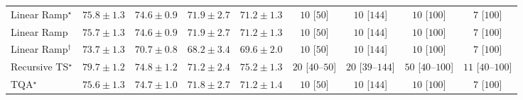 \begin{tabular}{l|cccc|cccc|}
Linear Ramp$^\star$ & {\cellcolor[HTML]{8948A0}} \color[HTML]{F1F1F1} $75.8\pm 1.3$ & {\cellcolor[HTML]{8A59A8}} \color[HTML]{F1F1F1} $74.6\pm 0.9$ & {\cellcolor[HTML]{8C81BC}} \color[HTML]{F1F1F1} $71.9\pm 2.7$ & {\cellcolor[HTML]{8C8CC1}} \color[HTML]{F1F1F1} $71.2\pm 1.3$ & {\cellcolor[HTML]{FFF7F3}} \color[HTML]{000000} $10$ [$50$] & {\cellcolor[HTML]{FFF7F3}} \color[HTML]{000000} $10$ [$144$] & {\cellcolor[HTML]{FFF7F3}} \color[HTML]{000000} $10$ [$100$] & {\cellcolor[HTML]{FFF7F3}} \color[HTML]{000000} $7$ [$100$] \\
Linear Ramp & {\cellcolor[HTML]{8949A1}} \color[HTML]{F1F1F1} $75.7\pm 1.3$ & {\cellcolor[HTML]{8A59A8}} \color[HTML]{F1F1F1} $74.6\pm 0.9$ & {\cellcolor[HTML]{8C81BC}} \color[HTML]{F1F1F1} $71.9\pm 2.7$ & {\cellcolor[HTML]{8C8CC1}} \color[HTML]{F1F1F1} $71.2\pm 1.3$ & {\cellcolor[HTML]{FFF7F3}} \color[HTML]{000000} $10$ [$50$] & {\cellcolor[HTML]{FFF7F3}} \color[HTML]{000000} $10$ [$144$] & {\cellcolor[HTML]{FFF7F3}} \color[HTML]{000000} $10$ [$100$] & {\cellcolor[HTML]{FFF7F3}} \color[HTML]{000000} $7$ [$100$] \\
Linear Ramp$^\dagger$ & {\cellcolor[HTML]{8C66AF}} \color[HTML]{F1F1F1} $73.7\pm 1.3$ & {\cellcolor[HTML]{8C93C4}} \color[HTML]{F1F1F1} $70.7\pm 0.8$ & {\cellcolor[HTML]{9AB4D6}} \color[HTML]{000000} $68.2\pm 3.4$ & {\cellcolor[HTML]{92A3CD}} \color[HTML]{F1F1F1} $69.6\pm 2.0$ & {\cellcolor[HTML]{FFF7F3}} \color[HTML]{000000} $10$ [$50$] & {\cellcolor[HTML]{FFF7F3}} \color[HTML]{000000} $10$ [$144$] & {\cellcolor[HTML]{FFF7F3}} \color[HTML]{000000} $10$ [$100$] & {\cellcolor[HTML]{FFF7F3}} \color[HTML]{000000} $7$ [$100$] \\
Recursive TS$^\star$ & {\cellcolor[HTML]{760C71}} \color[HTML]{F1F1F1} $79.7\pm 1.2$ & {\cellcolor[HTML]{8A56A7}} \color[HTML]{F1F1F1} $74.8\pm 1.2$ & {\cellcolor[HTML]{8C8CC1}} \color[HTML]{F1F1F1} $71.2\pm 2.4$ & {\cellcolor[HTML]{8950A4}} \color[HTML]{F1F1F1} $75.2\pm 1.3$ & {\cellcolor[HTML]{FFF4F0}} \color[HTML]{000000} $20$ [$40$--$50$] & {\cellcolor[HTML]{FFF4F0}} \color[HTML]{000000} $20$ [$39$--$144$] & {\cellcolor[HTML]{FEEEEA}} \color[HTML]{000000} $50$ [$40$--$100$] & {\cellcolor[HTML]{FFF6F2}} \color[HTML]{000000} $11$ [$40$--$100$] \\
TQA$^\star$ & {\cellcolor[HTML]{894BA2}} \color[HTML]{F1F1F1} $75.6\pm 1.3$ & {\cellcolor[HTML]{8A58A8}} \color[HTML]{F1F1F1} $74.7\pm 1.0$ & {\cellcolor[HTML]{8C82BC}} \color[HTML]{F1F1F1} $71.8\pm 2.7$ & {\cellcolor[HTML]{8C8CC1}} \color[HTML]{F1F1F1} $71.2\pm 1.4$ & {\cellcolor[HTML]{FFF7F3}} \color[HTML]{000000} $10$ [$50$] & {\cellcolor[HTML]{FFF7F3}} \color[HTML]{000000} $10$ [$144$] & {\cellcolor[HTML]{FFF7F3}} \color[HTML]{000000} $10$ [$100$] & {\cellcolor[HTML]{FFF7F3}} \color[HTML]{000000} $7$ [$100$] \\

\end{tabular}
